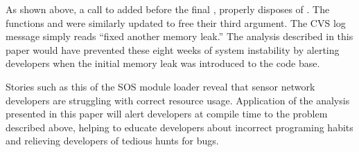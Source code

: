 As shown above, a call to  added before the final
, properly disposes of .
%
The functions  and  were
similarly updated to free their third argument.  
%
The CVS log message simply reads ``fixed another memory leak.''
%
The analysis described in this paper would have prevented these eight weeks of
system instability by alerting developers when the initial memory leak was
introduced to the code base.



Stories such as this of the SOS module loader reveal that sensor network
developers are struggling with correct resource usage.
%
Application of the analysis presented in this paper will alert developers at
compile time to the problem described above, helping to educate developers
about incorrect programing habits and relieving developers of tedious hunts
for bugs.


